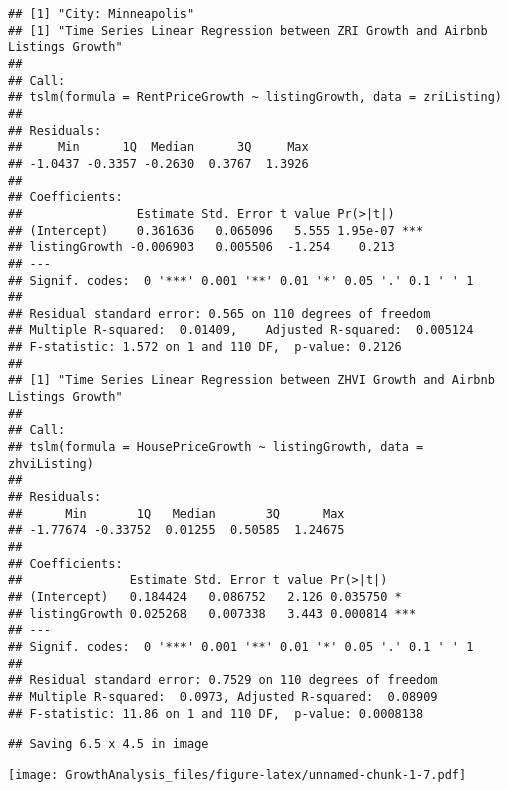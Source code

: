 \documentclass[
]{article}
\begin{document}
\begin{verbatim}
## [1] "City: Minneapolis"
## [1] "Time Series Linear Regression between ZRI Growth and Airbnb Listings Growth"
## 
## Call:
## tslm(formula = RentPriceGrowth ~ listingGrowth, data = zriListing)
## 
## Residuals:
##     Min      1Q  Median      3Q     Max 
## -1.0437 -0.3357 -0.2630  0.3767  1.3926 
## 
## Coefficients:
##                Estimate Std. Error t value Pr(>|t|)    
## (Intercept)    0.361636   0.065096   5.555 1.95e-07 ***
## listingGrowth -0.006903   0.005506  -1.254    0.213    
## ---
## Signif. codes:  0 '***' 0.001 '**' 0.01 '*' 0.05 '.' 0.1 ' ' 1
## 
## Residual standard error: 0.565 on 110 degrees of freedom
## Multiple R-squared:  0.01409,    Adjusted R-squared:  0.005124 
## F-statistic: 1.572 on 1 and 110 DF,  p-value: 0.2126
## 
## [1] "Time Series Linear Regression between ZHVI Growth and Airbnb Listings Growth"
## 
## Call:
## tslm(formula = HousePriceGrowth ~ listingGrowth, data = zhviListing)
## 
## Residuals:
##      Min       1Q   Median       3Q      Max 
## -1.77674 -0.33752  0.01255  0.50585  1.24675 
## 
## Coefficients:
##               Estimate Std. Error t value Pr(>|t|)    
## (Intercept)   0.184424   0.086752   2.126 0.035750 *  
## listingGrowth 0.025268   0.007338   3.443 0.000814 ***
## ---
## Signif. codes:  0 '***' 0.001 '**' 0.01 '*' 0.05 '.' 0.1 ' ' 1
## 
## Residual standard error: 0.7529 on 110 degrees of freedom
## Multiple R-squared:  0.0973, Adjusted R-squared:  0.08909 
## F-statistic: 11.86 on 1 and 110 DF,  p-value: 0.0008138
\end{verbatim}

\begin{verbatim}
## Saving 6.5 x 4.5 in image
\end{verbatim}

\texttt{[image: GrowthAnalysis\_files/figure-latex/unnamed-chunk-1-7.pdf]}
\end{document}
